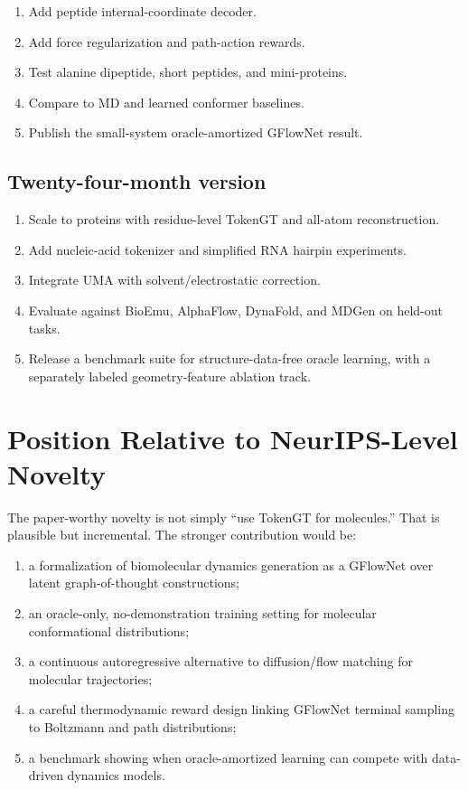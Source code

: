 \documentclass[11pt]{article}
\begin{document}
\begin{enumerate}[leftmargin=2em]
  \item Add peptide internal-coordinate decoder.
  \item Add force regularization and path-action rewards.
  \item Test alanine dipeptide, short peptides, and mini-proteins.
  \item Compare to MD and learned conformer baselines.
  \item Publish the small-system oracle-amortized GFlowNet result.
\end{enumerate}

\subsection{Twenty-four-month version}

\begin{enumerate}[leftmargin=2em]
  \item Scale to proteins with residue-level TokenGT and all-atom reconstruction.
  \item Add nucleic-acid tokenizer and simplified RNA hairpin experiments.
  \item Integrate UMA with solvent/electrostatic correction.
  \item Evaluate against BioEmu, AlphaFlow, DynaFold, and MDGen on held-out tasks.
  \item Release a benchmark suite for structure-data-free oracle learning, with a separately labeled geometry-feature ablation track.
\end{enumerate}

\section{Position Relative to NeurIPS-Level Novelty}

The paper-worthy novelty is not simply ``use TokenGT for molecules.'' That is plausible but incremental. The stronger contribution would be:
\begin{enumerate}[leftmargin=2em]
  \item a formalization of biomolecular dynamics generation as a GFlowNet over latent graph-of-thought constructions;
  \item an oracle-only, no-demonstration training setting for molecular conformational distributions;
  \item a continuous autoregressive alternative to diffusion/flow matching for molecular trajectories;
  \item a careful thermodynamic reward design linking GFlowNet terminal sampling to Boltzmann and path distributions;
  \item a benchmark showing when oracle-amortized learning can compete with data-driven dynamics models.
\end{enumerate}
\end{document}
